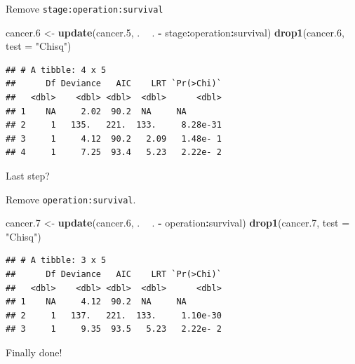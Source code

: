 \documentclass[
  ignorenonframetext,
]{beamer}
\newenvironment{Shaded}{\begin{snugshade}}{\end{snugshade}}
\newcommand{\DataTypeTok}[1]{\textcolor[rgb]{0.13,0.29,0.53}{#1}}
\newcommand{\FloatTok}[1]{\textcolor[rgb]{0.00,0.00,0.81}{#1}}
\newcommand{\KeywordTok}[1]{\textcolor[rgb]{0.13,0.29,0.53}{\textbf{#1}}}
\newcommand{\NormalTok}[1]{#1}
\newcommand{\OperatorTok}[1]{\textcolor[rgb]{0.81,0.36,0.00}{\textbf{#1}}}
\newcommand{\StringTok}[1]{\textcolor[rgb]{0.31,0.60,0.02}{#1}}
\begin{document}
\begin{frame}[fragile]{Remove \texttt{stage:operation:survival}}
\protect\hypertarget{remove-stageoperationsurvival}{}

\scriptsize

\begin{Shaded}
\begin{Highlighting}[]
\NormalTok{cancer}\FloatTok{.6}\NormalTok{ <-}\StringTok{ }\KeywordTok{update}\NormalTok{(cancer}\FloatTok{.5}\NormalTok{, . }\OperatorTok{~}\StringTok{ }\NormalTok{. }\OperatorTok{-}\StringTok{ }\NormalTok{stage}\OperatorTok{:}\NormalTok{operation}\OperatorTok{:}\NormalTok{survival)}
\KeywordTok{drop1}\NormalTok{(cancer}\FloatTok{.6}\NormalTok{, }\DataTypeTok{test =} \StringTok{"Chisq"}\NormalTok{)}
\end{Highlighting}
\end{Shaded}

\begin{verbatim}
## # A tibble: 4 x 5
##      Df Deviance   AIC    LRT `Pr(>Chi)`
##   <dbl>    <dbl> <dbl>  <dbl>      <dbl>
## 1    NA     2.02  90.2  NA     NA       
## 2     1   135.   221.  133.     8.28e-31
## 3     1     4.12  90.2   2.09   1.48e- 1
## 4     1     7.25  93.4   5.23   2.22e- 2
\end{verbatim}

\normalsize

\end{frame}

\begin{frame}[fragile]{Last step?}
\protect\hypertarget{last-step}{}

Remove \texttt{operation:survival}.

\footnotesize

\begin{Shaded}
\begin{Highlighting}[]
\NormalTok{cancer}\FloatTok{.7}\NormalTok{ <-}\StringTok{ }\KeywordTok{update}\NormalTok{(cancer}\FloatTok{.6}\NormalTok{, . }\OperatorTok{~}\StringTok{ }\NormalTok{. }\OperatorTok{-}\StringTok{ }\NormalTok{operation}\OperatorTok{:}\NormalTok{survival)}
\KeywordTok{drop1}\NormalTok{(cancer}\FloatTok{.7}\NormalTok{, }\DataTypeTok{test =} \StringTok{"Chisq"}\NormalTok{)}
\end{Highlighting}
\end{Shaded}

\begin{verbatim}
## # A tibble: 3 x 5
##      Df Deviance   AIC    LRT `Pr(>Chi)`
##   <dbl>    <dbl> <dbl>  <dbl>      <dbl>
## 1    NA     4.12  90.2  NA     NA       
## 2     1   137.   221.  133.     1.10e-30
## 3     1     9.35  93.5   5.23   2.22e- 2
\end{verbatim}

\normalsize

Finally done!

\end{frame}
\end{document}
